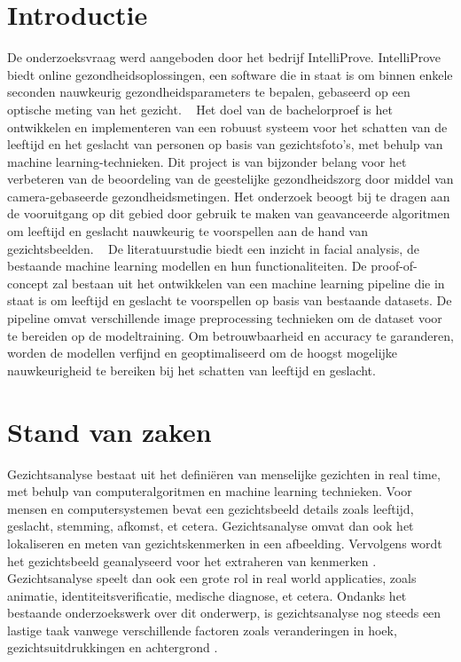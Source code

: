 
\section{Introductie}%
\label{sec:introductie}

De onderzoeksvraag werd aangeboden door het bedrijf IntelliProve. IntelliProve biedt online gezondheidsoplossingen, een software die in staat is om binnen enkele seconden nauwkeurig gezondheidsparameters te bepalen, gebaseerd op een optische meting van het gezicht.  
Het doel van de bachelorproef is het ontwikkelen en implementeren van een robuust systeem voor het schatten van de leeftijd en het geslacht van personen op basis van gezichtsfoto's, met behulp van machine learning-technieken. 
Dit project is van bijzonder belang voor het verbeteren van de beoordeling van de geestelijke gezondheidszorg door middel van camera-gebaseerde gezondheidsmetingen. Het onderzoek beoogt bij te dragen aan de vooruitgang op dit gebied door gebruik te maken van geavanceerde algoritmen om leeftijd en geslacht nauwkeurig te voorspellen aan de hand van gezichtsbeelden.  
De literatuurstudie biedt een inzicht in facial analysis, de bestaande machine learning modellen en hun functionaliteiten. De proof-of-concept zal bestaan uit het ontwikkelen van een machine learning pipeline die in staat is om leeftijd en geslacht te voorspellen op basis van bestaande datasets. De pipeline omvat verschillende image preprocessing technieken om de dataset voor te bereiden op de modeltraining. Om betrouwbaarheid en accuracy te garanderen, worden de modellen verfijnd en geoptimaliseerd om de hoogst mogelijke nauwkeurigheid te bereiken bij het schatten van leeftijd en geslacht.

\section{Stand van zaken}
\label{sec:stand-van-zaken}

Gezichtsanalyse bestaat uit het definiëren van menselijke gezichten in real time, met behulp van computeralgoritmen en machine learning technieken. Voor mensen en computersystemen bevat een gezichtsbeeld details zoals leeftijd, geslacht, stemming, afkomst, et cetera.
Gezichtsanalyse omvat dan ook het lokaliseren en meten van gezichtskenmerken in een afbeelding. Vervolgens wordt het gezichtsbeeld geanalyseerd voor het extraheren van kenmerken \autocite{Sanil2023}. Gezichtsanalyse speelt dan ook een grote rol in real world applicaties, zoals animatie, identiteitsverificatie, medische diagnose, et cetera. Ondanks het bestaande onderzoekswerk over dit onderwerp, is gezichtsanalyse nog steeds een lastige taak vanwege verschillende factoren zoals veranderingen in hoek, gezichtsuitdrukkingen en achtergrond \autocite{Siddiqi2022}.

